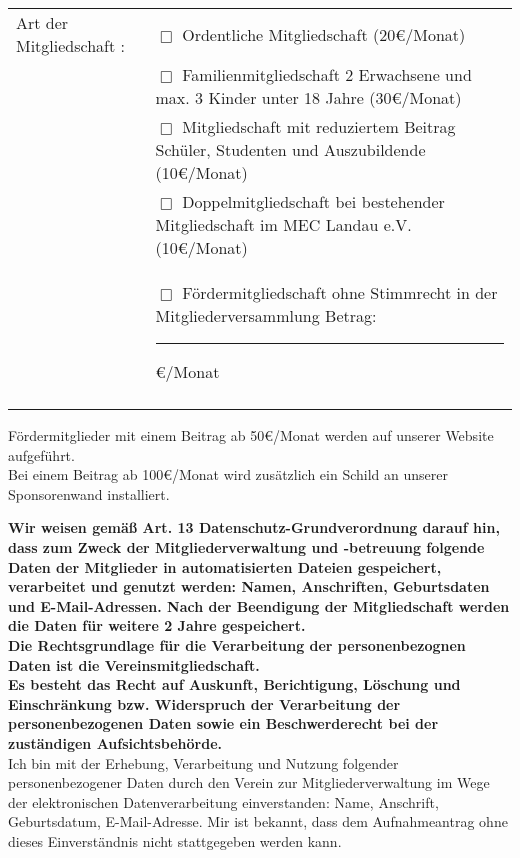 \documentclass[a4paper, 11pt]{scrartcl}
\begin{document}
\begin{tabularx}{\linewidth}{lX}
	Art der Mitgliedschaft : 	& $\Box$ Ordentliche Mitgliedschaft \newline (20\euro/Monat)\\
								& $\Box$ Familienmitgliedschaft {\tiny 2 Erwachsene und max. 3 Kinder unter 18 Jahre}  \newline (30\euro/Monat)\\
								& $\Box$ Mitgliedschaft mit reduziertem Beitrag {\tiny Schüler, Studenten und Auszubildende}  \newline (10\euro/Monat)\\
								& $\Box$ Doppelmitgliedschaft {\tiny bei bestehender Mitgliedschaft im MEC Landau e.V.} \newline (10\euro/Monat)\\
								& $\Box$ Fördermitgliedschaft {\tiny ohne Stimmrecht in der Mitgliederversammlung} \newline Betrag: \rule{3cm}{.4pt}\euro/Monat\\\\
\end{tabularx}

Fördermitglieder mit einem Beitrag ab 50\euro/Monat werden auf unserer Website aufgeführt. \\
Bei einem Beitrag ab 100\euro/Monat wird zusätzlich ein Schild an unserer Sponsorenwand installiert.

\vspace{0.5cm}

\textbf{Wir weisen gemäß Art. 13 Datenschutz-Grundverordnung darauf hin, dass zum Zweck der Mitgliederverwaltung und -betreuung folgende Daten der Mitglieder in automatisierten Dateien gespeichert, verarbeitet und genutzt werden: Namen, Anschriften, Geburtsdaten und E-Mail-Adressen. Nach der Beendigung der Mitgliedschaft werden die Daten für weitere 2 Jahre gespeichert.\\
Die Rechtsgrundlage für die Verarbeitung der personenbezognen Daten ist die Vereinsmitgliedschaft.\\
Es besteht das Recht auf Auskunft, Berichtigung, Löschung und Einschränkung bzw. Widerspruch der Verarbeitung der personenbezogenen Daten sowie ein Beschwerderecht bei der zuständigen Aufsichtsbehörde.}\\

Ich bin mit der Erhebung, Verarbeitung und Nutzung folgender personenbezogener Daten durch den Verein zur Mitgliederverwaltung im Wege der elektronischen Datenverarbeitung einverstanden: Name, Anschrift, Geburtsdatum, E-Mail-Adresse. Mir ist bekannt, dass dem Aufnahmeantrag ohne dieses Einverständnis nicht stattgegeben werden kann.\\
\end{document}
